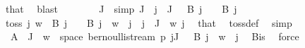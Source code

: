 \begin{isabellebody}
\ that\ \isamarkupfalse%
\ blast\isanewline
\isanewline
\isanewline
\ \ \ \ \ \ \isamarkupfalse%
\ J{\isacharprime}{\kern0pt}\ \ {\isacharbrackleft}{\kern0pt}simp{\isacharbrackright}{\kern0pt}{\isacharcolon}{\kern0pt}\ {\isachardoublequoteopen}J{\isacharprime}{\kern0pt}\ {\isacharequal}{\kern0pt}\ {\isacharbraceleft}{\kern0pt}j\ {\isasymin}\ J{\isachardot}{\kern0pt}\ {\isacharparenleft}{\kern0pt}{}\ {\isasymin}\ B\ j{\isacharparenright}{\kern0pt}\ {\isasymlongleftrightarrow}\ {\isacharparenleft}{\kern0pt}{\isacharminus}{\kern0pt}{}\ {\isasymnotin}\ B\ j{\isacharparenright}{\kern0pt}{\isacharbraceright}{\kern0pt}{\isachardoublequoteclose}\isanewline
\ \ \ \ \ \ \isamarkupfalse%
\ {\isachardoublequoteopen}toss\ j\ w\ {\isasymin}\ B\ j\ {\isasymlongleftrightarrow}\ {\isacharparenleft}{\kern0pt}{}\ {\isasymin}\ B\ j{\isacharparenright}{\kern0pt}\ {\isacharequal}{\kern0pt}\ w\ {\isacharbang}{\kern0pt}{\isacharbang}{\kern0pt}\ j{\isachardoublequoteclose}\ \ {\isachardoublequoteopen}j\ {\isasymin}\ J{\isacharprime}{\kern0pt}{\isachardoublequoteclose}\ \ w\ j\ \isamarkupfalse%
\ that\ \isamarkupfalse%
\ toss{\isacharunderscore}{\kern0pt}def\ \isamarkupfalse%
\ simp\isanewline
\ \ \ \ \ \ \isamarkupfalse%
\ {\isachardoublequoteopen}{\isacharparenleft}{\kern0pt}{\isasymInter}\ {\isacharparenleft}{\kern0pt}A\ {\isacharbackquote}{\kern0pt}\ J{\isacharprime}{\kern0pt}{\isacharparenright}{\kern0pt}{\isacharparenright}{\kern0pt}\ {\isacharequal}{\kern0pt}\ {\isacharbraceleft}{\kern0pt}w\ {\isasymin}\ space\ {\isacharparenleft}{\kern0pt}bernoulli{\isacharunderscore}{\kern0pt}stream\ p{\isacharparenright}{\kern0pt}{\isachardot}{\kern0pt}\ {\isasymforall}j{\isasymin}J{\isacharprime}{\kern0pt}{\isachardot}{\kern0pt}\ {\isacharparenleft}{\kern0pt}{}\ {\isasymin}\ B\ j{\isacharparenright}{\kern0pt}\ {\isacharequal}{\kern0pt}\ w\ {\isacharbang}{\kern0pt}{\isacharbang}{\kern0pt}\ j{\isacharbraceright}{\kern0pt}{\isachardoublequoteclose}\ \isamarkupfalse%
\ B{\isacharunderscore}{\kern0pt}is\ \isamarkupfalse%
\ force\isanewline
\ \ \ \ \ \ \isamarkupfalse%

\end{isabellebody}
